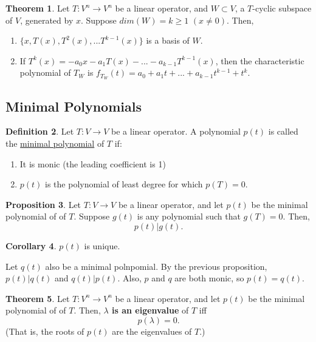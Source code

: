 \documentclass[a5paper]{article}
\makeatletter
\renewenvironment{proof}{{\bfseries Proof}}{\qed}
\renewenvironment{proof}[1][\bfseries \proofname]{\par
  \pushQED{\qed}%
  \normalfont \topsep6\p@\@plus6\p@\relax
  \trivlist
  \item[\hskip\labelsep
        \scshape
    #1\@addpunct{}]\ignorespaces
}{%
  \popQED\endtrivlist\@endpefalse
}
\theoremstyle{definition}%
\newtheorem{theorem}{Theorem}
\numberwithin{theorem}{section} %
\newtheorem{corollary}[theorem]{Corollary}
\newtheorem{definition}[theorem]{Definition}
\newtheorem{proposition}[theorem]{Proposition}
\makeatother
\begin{document}
\begin{theorem}
Let $T:V^n \to V^n$ be a linear operator, and $W \subset V$, a $T$-cyclic subspace of $V$, generated by $x$. Suppose $dim(W) = k \geq 1 $ $(x\neq0)$. Then, 
\begin{enumerate}
\item $\{x, T(x), T^2(x), ... T^{k-1}(x)\}$ is a basis of $W$.
\item If $T^k(x) = -a_0x - a_1T(x) - ... - a_{k-1}T^{k-1}(x)$, then the characteristic polynomial of $T_W$ is $f_{T_W}(t) = a_0 + a_1t + ... + a_{k-1}t^{k-1}+t^k$.
\end{enumerate}
\end{theorem}

\subsection{Minimal Polynomials}

\begin{definition}
Let $T:V \to V$ be a linear operator. A polynomial $p(t)$ is called the \underline{minimal polynomial} of $T$ if:
\begin{enumerate}
\item It is monic (the leading coefficient is 1)
\item $p(t)$ is the polynomial of least degree for which $p(T)=0$.
\end{enumerate}

\end{definition}

\begin{proposition}
Let $T:V \to V$ be a linear operator, and let $p(t)$ be the minimal polynomial of of $T$. Suppose $g(t)$ is any polynomial such that $g(T) = 0$. Then, $$p(t) | g(t).$$
\end{proposition}

\begin{corollary}
$p(t)$ is unique. 
\begin{proof}
Let $q(t)$ also be a minimal polnpomial.
By the previous proposition, $p(t) | q(t)$ and $q(t) | p(t)$. Also, $p$ and $q$ are both monic, so $p(t)=q(t)$. 
\end{proof}
\end{corollary}

\begin{theorem}
Let $T:V^n \to V^n$ be a linear operator, and let $p(t)$ be the minimal polynomial of of $T$. Then, \textbf{$\lambda$ is an eigenvalue} of $T$ iff $$p(\lambda)=0.$$ (That is, the roots of $p(t)$ are the eigenvalues of $T$.)
\end{theorem}
\end{document}
